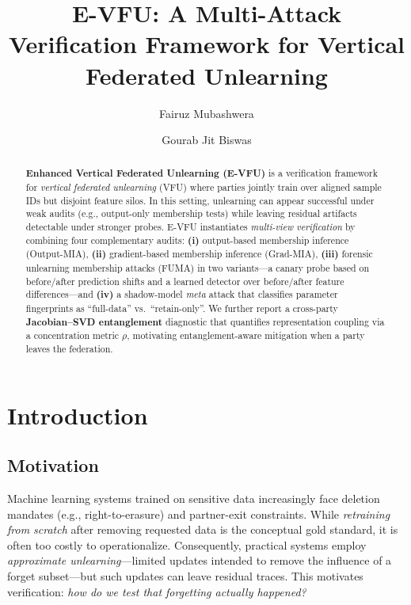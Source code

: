 \documentclass[sigconf,nonacm]{acmart}
\begin{document}
\sloppy
\setlength{\emergencystretch}{2em}

\title{E-VFU: A Multi-Attack Verification Framework for Vertical Federated Unlearning}

\author{Fairuz Mubashwera}

  \author{Gourab Jit Biswas}

\begin{abstract}
\textbf{Enhanced Vertical Federated Unlearning (E-VFU)} is a verification framework for \emph{vertical federated unlearning} (VFU) where parties jointly train over aligned sample IDs but disjoint feature silos. In this setting, unlearning can appear successful under weak audits (e.g., output-only membership tests) while leaving residual artifacts detectable under stronger probes. E-VFU instantiates \emph{multi-view verification} by combining four complementary audits: \textbf{(i)} output-based membership inference (Output-MIA), \textbf{(ii)} gradient-based membership inference (Grad-MIA), \textbf{(iii)} forensic unlearning membership attacks (FUMA) in two variants---a canary probe based on before/after prediction shifts and a learned detector over before/after feature differences---and \textbf{(iv)} a shadow-model \emph{meta} attack that classifies parameter fingerprints as ``full-data'' vs.\ ``retain-only''. We further report a cross-party \textbf{Jacobian--SVD entanglement} diagnostic that quantifies representation coupling via a concentration metric $\rho$, motivating entanglement-aware mitigation when a party leaves the federation.

\end{abstract}


\maketitle

\section{Introduction}

\subsection{Motivation}
Machine learning systems trained on sensitive data increasingly face deletion mandates (e.g., right-to-erasure) and partner-exit constraints. While \emph{retraining from scratch} after removing requested data is the conceptual gold standard, it is often too costly to operationalize. Consequently, practical systems employ \emph{approximate unlearning}---limited updates intended to remove the influence of a forget subset---but such updates can leave residual traces. This motivates verification: \emph{how do we test that forgetting actually happened?}
\end{document}
